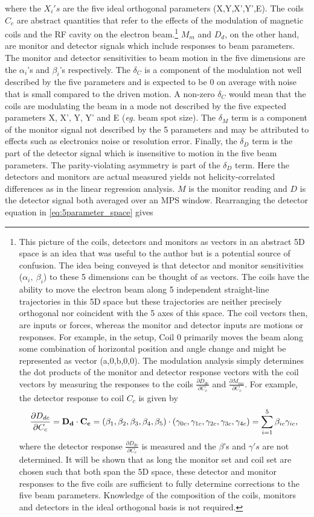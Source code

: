 where the $X_i's$ are the five ideal orthogonal parameters (X,Y,X',Y',E). The coils $C_c$ are abstract quantities that refer to the effects of the modulation of magnetic coils and the RF cavity on the electron beam.\footnote{This picture of the coils, detectors and monitors as vectors in an abstract 5D space is an idea that was useful to the author but is a potential source of confusion. The idea being conveyed is that detector and monitor sensitivities ($\alpha_i,~\beta_i$) to these 5 dimensions can be thought of as vectors. The coils have the ability to move the electron beam along 5 independent straight-line trajectories in this 5D space but these trajectories are neither precisely orthogonal nor coincident with the 5 axes of this space. The coil vectors then, are inputs or forces, whereas the monitor and detector inputs are motions or responses. For example, in the \Qs setup, Coil 0 primarily moves the beam along some combination of horizontal position and angle change and might be represented as vector (a,0,b,0,0). The modulation analysis simply determines the dot products of the monitor and detector response vectors with the coil vectors by measuring the responses to the coils $\frac{\partial D_{dc}}{\partial C_c}$ and $\frac{\partial M_{mc}}{\partial C_c}$. For example, the detector response to coil $C_c$ is given by \[\frac{\partial D_{dc}}{\partial C_c}={\bf D_{d}\cdot C_c}=(\beta_{1},\beta_{2},\beta_{3},\beta_{4},\beta_{5})\cdot(\gamma_{0c},\gamma_{1c},\gamma_{2c},\gamma_{3c},\gamma_{4c})=\sum_{i=1}^5\beta_{ic}\gamma_{ic},\] where the detector response $\frac{\partial D_{dc}}{\partial C_c}$ is measured and the $\beta$'s and $\gamma's$ are not determined. It will be shown that as long the monitor set and coil set are chosen such that both span the 5D space, these detector and monitor responses to the five coils are sufficient to fully determine corrections to the five beam parameters. Knowledge of the composition of the coils, monitors and detectors in the ideal orthogonal basis is not required. } $M_{m}$ and $D_{d}$, on the other hand, are monitor and detector signals which include responses to beam parameters. The monitor and detector sensitivities to beam motion in the five dimensions are the $\alpha_i$'s and $\beta_i$'s respectively. The $\delta_C$ is a component of the modulation not well described by the five parameters and is expected to be 0 on average with noise that is small compared to the driven motion. A non-zero $\delta_C$ would mean that the coils are modulating the beam in a mode not described by the five expected parameters X, X', Y, Y' and E ({\it eg.} beam spot size). The $\delta_M$ term is a component of the monitor signal not described by the 5 parameters and may be attributed to effects such as electronics noise or resolution error. Finally, the $\delta_D$ term is the part of the detector signal which is insensitive to motion in the five beam parameters. The parity-violating asymmetry is part of the $\delta_D$ term. Here the detectors and monitors are actual measured yields not helicity-correlated differences as in the linear regression analysis. $M$ is the monitor reading and $D$ is the detector signal both averaged over an MPS window.  Rearranging the detector equation in \ref{eq:5parameter_space} gives

